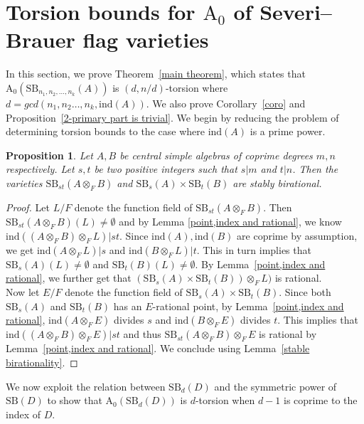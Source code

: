 \documentclass[10pt]{amsart}
\theoremstyle{plain}
\newtheorem{proposition}[thm]{Proposition}
\theoremstyle{definition}
\begin{document}
\section{Torsion bounds for \(\mathrm{A_0}\) of Severi--Brauer flag varieties}\label{proof of main thm}
In this section, we prove Theorem~\ref{main theorem}, which states that \(\mathrm{A_0}(\mathrm{SB}_{n_1,n_2,\dots,n_k}(A))\) is \((d,n/d)\)-torsion where \(d = gcd(n_1,n_2 \ldots,n_k,\mathrm{ind}(A))\). We also prove Corollary~\ref{coro} and Proposition~\ref{2-primary part is trivial}. We begin by reducing the problem of determining torsion bounds to the case where \(\mathrm{ind}(A)\) is a prime power.
\begin{proposition}\label{coprime degrees}
    Let \(A, B\) be central simple algebras of coprime degrees \(m,n\) respectively. Let \(s,t\) be two positive integers such that \(s|m\) and \(t |n\). Then the varieties \(\mathrm{SB}_{st}(A \otimes_F B)\) and \(\mathrm{SB}_s(A) \times \mathrm{SB}_t(B)\) are stably birational.
\end{proposition}
\begin{proof}
Let \(L/F\) denote the function field of \(\mathrm{SB}_{st}(A \otimes_F B)\). Then \(\mathrm{SB}_{st}(A \otimes_F B)(L) \neq \emptyset\) and by Lemma \ref{point,index and rational}, we know \(\mathrm{ind}((A \otimes_F B) \otimes_F L)|st\). Since \(\mathrm{ind}(A),\mathrm{ind}(B)\) are coprime by assumption, we get \(\mathrm{ind}(A \otimes_F L) | s\) and \(\mathrm{ind}(B \otimes_F L) |t \). This in turn implies that \(\mathrm{SB}_s(A) (L) \neq \emptyset\) and \( \mathrm{SB}_t(B)(L) \neq \emptyset\). By Lemma~\ref{point,index and rational}, we further get that \((\mathrm{SB}_s(A) \times \mathrm{SB}_t(B)) \otimes_F L) \) is rational. \\
Now let \(E/F\) denote the function field of \(\mathrm{SB}_s(A) \times \mathrm{SB}_t(B)\). Since 
both \(\mathrm{SB}_s(A)\) and \(\mathrm{SB}_t(B)\) has an \(E\)-rational point, by Lemma~\ref{point,index and rational}, \(\mathrm{ind}(A \otimes_F E)\) divides \(s\) and \(\mathrm{ind}(B \otimes_F E)\) divides \(t\). This implies that \(\mathrm{ind}((A \otimes_F B) \otimes_F E)|st\) and thus \(\mathrm{SB}_{st}(A \otimes_F B) \otimes_F E\) is rational by Lemma~\ref{point,index and rational}. We conclude using Lemma~\ref{stable birationality}.
\end{proof}
We now exploit the relation between \(\mathrm{SB}_d(D)\) and the symmetric power of \(\mathrm{SB}(D)\) to show that \(\mathrm{A_0}(\mathrm{SB}_d(D))\) is \(d\)-torsion when \(d-1\) is coprime to the index of \(D\). 
\end{document}
